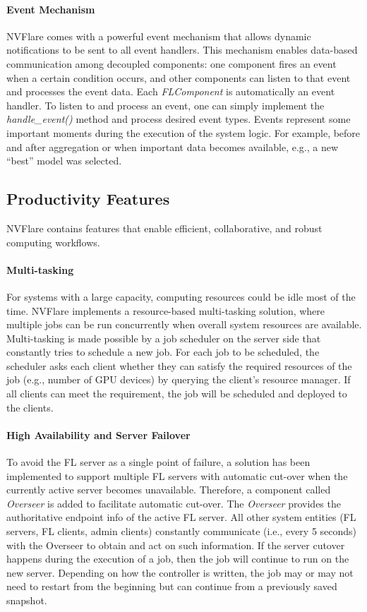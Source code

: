 \documentclass[11pt]{article}
\begin{document}
\paragraph{Event Mechanism} NVFlare comes with a powerful event mechanism that allows dynamic notifications to be sent to all event handlers. This mechanism enables data-based communication among decoupled components: one component fires an event when a certain condition occurs, and other components can listen to that event and processes the event data. Each \textit{FLComponent} is automatically an event handler. To listen to and process an event, one can simply implement the \textit{handle\_event()} method and process desired event types. Events represent some important moments during the execution of the system logic. For example, before and after aggregation or when important data becomes available, e.g., a new ``best'' model was selected.
%
\subsection{Productivity Features}
NVFlare contains features that enable efficient, collaborative, and robust computing workflows.

\paragraph{Multi-tasking} For systems with a large capacity, computing resources could be idle most of the time. NVFlare implements a resource-based multi-tasking solution, where multiple jobs can be run concurrently when overall system resources are available. 
Multi-tasking is made possible by a job scheduler on the server side that constantly tries to schedule a new job.
For each job to be scheduled, the scheduler asks each client whether they can satisfy the required resources of the job (e.g., number of GPU devices) by querying the client's resource manager. If all clients can meet the requirement, the job will be scheduled and deployed to the clients.

\paragraph{High Availability and Server Failover} To avoid the FL server as a single point of failure, a solution has been implemented to support multiple FL servers with automatic cut-over when the currently active server becomes unavailable. 
Therefore, a component called \textit{Overseer} is added to facilitate automatic cut-over. The \textit{Overseer} provides the authoritative endpoint info of the active FL server. All other system entities (FL servers, FL clients, admin clients) constantly communicate (i.e., every 5 seconds) with the Overseer to obtain and act on such information. 
%
If the server cutover happens during the execution of a job, then the job will continue to run on the new server. Depending on how the controller is written, the job may or may not need to restart from the beginning but can continue from a previously saved snapshot. 
\end{document}
